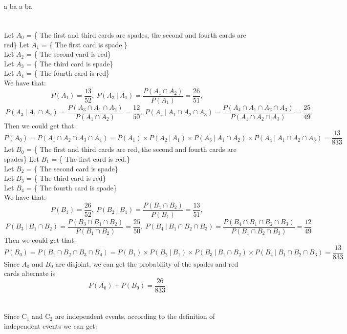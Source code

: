 \documentclass[10.5pt]{article}
\begin{document}
\section{}
a ba a ba

\section{}
Let $A_0$ = \{ The first and third cards are spades, the second and fourth cards are red\}
\indent
Let $A_1$ = \{ The first card is spade.\}\\
\indent
Let $A_2$ = \{ The second card is red\}\\
\indent
Let $A_3$ = \{ The third card is spade\}\\
\indent
Let $A_4$ = \{ The fourth card is red\}\\
\indent
We have that:$$P(A_1) = \frac{13}{52},~P(A_2~|~A_1) = \frac{P(A_1\cap A_2)}{P(A_1)} = \frac{26}{51},$$$$~P(A_3~|~A_1\cap A_2) = \frac{P(A_3\cap A_1\cap A_2)}{P(A_1\cap A_2)} = \frac{12}{50},~P(A_4~|~A_1\cap A_2\cap A_3) = \frac{P(A_4\cap A_1\cap A_2\cap A_3)}{P(A_1\cap A_2\cap A_3)} = \frac{25}{49}$$
\indent
Then we could get that:$$P(A_0) = P(A_1\cap A_2\cap A_3\cap A_4) = P(A_1)\times P(A_2~|~A_1)\times P(A_3~|~A_1\cap A_2)\times P(A_4~|~A_1\cap A_2\cap A_3) = \frac{13}{833}$$
\indent
Let $B_0$ = \{ The first and third cards are red, the second and fourth cards are spades\}
\indent
Let $B_1$ = \{ The first card is red.\}\\
\indent
Let $B_2$ = \{ The second card is spade\}\\
\indent
Let $B_3$ = \{ The third card is red\}\\
\indent
Let $B_4$ = \{ The fourth card is spade\}\\
\indent
We have that:$$P(B_1) = \frac{26}{52},~P(B_2~|~B_1) = \frac{P(B_1\cap B_2)}{P(B_1)} = \frac{13}{51},$$$$~P(B_3~|~B_1\cap B_2) = \frac{P(B_3\cap B_1\cap B_2)}{P(B_1\cap B_2)} = \frac{25}{50},~P(B_4~|~B_1\cap B_2\cap B_3) = \frac{P(B_4\cap B_1\cap B_2\cap B_3)}{P(B_1\cap B_2\cap B_3)} = \frac{12}{49}$$
\indent
Then we could get that:$$P(B_0) = P(B_1\cap B_2\cap B_3\cap B_4) = P(B_1)\times P(B_2~|~B_1)\times P(B_3~|~B_1\cap B_2)\times P(B_4~|~B_1\cap B_2\cap B_3) = \frac{13}{833}$$
\indent
Since $A_0$ and $B_0$ are disjoint, we can get the probability of  the spades and red cards alternate is $$P(A_0) + P(B_0) = \frac{26}{833}$$

\section{}
Since C$_{1}$ and C$_{2}$ are independent events, according to the definition of independent events we can get:
\end{document}
